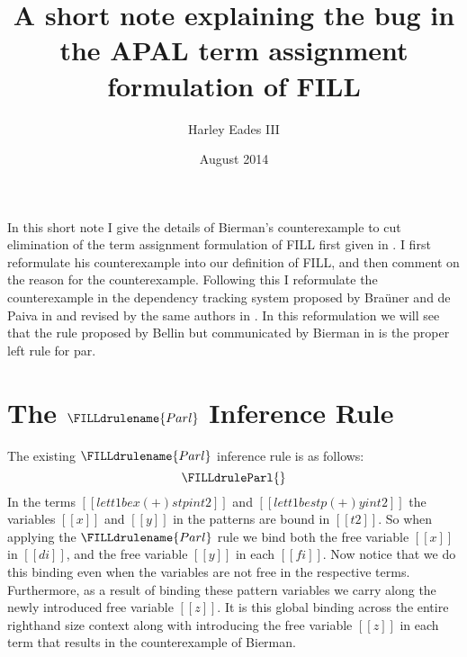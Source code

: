 \documentclass{article}
\title{A short note explaining the bug in the APAL term assignment formulation of FILL}
\author{Harley Eades III}
\date{August 2014}
\begin{document}
\maketitle

In this short note I give the details of Bierman's counterexample
\cite{Bierman:1996} to cut elimination of the term assignment
formulation of FILL first given in \cite{Hyland:1993}.  I first
reformulate his counterexample into our definition of FILL, and then
comment on the reason for the counterexample.  Following this I
reformulate the counterexample in the dependency tracking system
proposed by Bra\"uner and de Paiva in \cite{Brauner:1996} and revised
by the same authors in \cite{Brauner:1998}.  In this reformulation we
 will see that the rule proposed
by Bellin but communicated by Bierman in \cite{Bierman:1996} is the
proper left rule for par.

\section{The $\FILLdrulename{Parl}$ Inference Rule}
\label{sec:the_parl_inference_rule}
The existing $\FILLdrulename{Parl}$ inference rule is as follows:
\[
  \FILLdruleParl{}
\]
In the terms $[[let t1 be x (+) stp in t2]]$ and $[[let t1 be stp (+) y
in t2]]$ the variables $[[x]]$ and $[[y]]$ in the patterns are bound
in $[[t2]]$. So when applying the $\FILLdrulename{Parl}$ rule we bind
both the free variable $[[x]]$ in $[[di]]$, and the free variable
$[[y]]$ in each $[[fi]]$.  Now notice that we do this binding even
when the variables are not free in the respective terms.  Furthermore,
as a result of binding these pattern variables we carry along the
newly introduced free variable $[[z]]$.  It is this global binding
across the entire righthand size context along with introducing the
free variable $[[z]]$ in each term that results in the counterexample
of Bierman.
\end{document}
